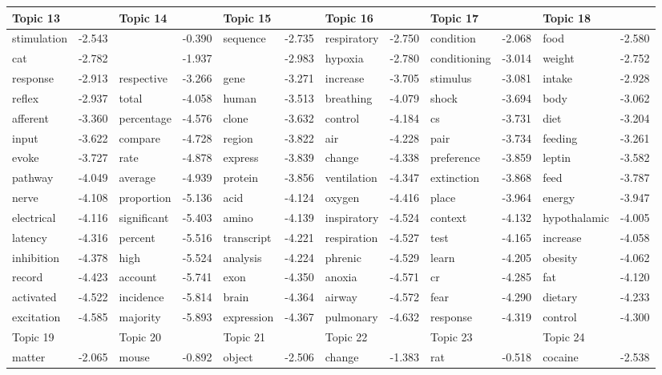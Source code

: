 \documentclass{article}
\begin{document}
\begin{table}
{\begin{tabular}{|l r|l r|l r|l r|l r|l r|}
\hline
\hline
Topic 13 & &Topic 14 & &Topic 15 & &Topic 16 & &Topic 17 & &Topic 18 &\\
\hline
stimulation & -2.543 &  & -0.390 & sequence & -2.735 & respiratory & -2.750 & condition & -2.068 & food & -2.580\\
cat & -2.782 &  & -1.937 &  & -2.983 & hypoxia & -2.780 & conditioning & -3.014 & weight & -2.752\\
response & -2.913 & respective & -3.266 & gene & -3.271 & increase & -3.705 & stimulus & -3.081 & intake & -2.928\\
reflex & -2.937 & total & -4.058 & human & -3.513 & breathing & -4.079 & shock & -3.694 & body & -3.062\\
afferent & -3.360 & percentage & -4.576 & clone & -3.632 & control & -4.184 & cs & -3.731 & diet & -3.204\\
input & -3.622 & compare & -4.728 & region & -3.822 & air & -4.228 & pair & -3.734 & feeding & -3.261\\
evoke & -3.727 & rate & -4.878 & express & -3.839 & change & -4.338 & preference & -3.859 & leptin & -3.582\\
pathway & -4.049 & average & -4.939 & protein & -3.856 & ventilation & -4.347 & extinction & -3.868 & feed & -3.787\\
nerve & -4.108 & proportion & -5.136 & acid & -4.124 & oxygen & -4.416 & place & -3.964 & energy & -3.947\\
electrical & -4.116 & significant & -5.403 & amino & -4.139 & inspiratory & -4.524 & context & -4.132 & hypothalamic & -4.005\\
latency & -4.316 & percent & -5.516 & transcript & -4.221 & respiration & -4.527 & test & -4.165 & increase & -4.058\\
inhibition & -4.378 & high & -5.524 & analysis & -4.224 & phrenic & -4.529 & learn & -4.205 & obesity & -4.062\\
record & -4.423 & account & -5.741 & exon & -4.350 & anoxia & -4.571 & cr & -4.285 & fat & -4.120\\
activated & -4.522 & incidence & -5.814 & brain & -4.364 & airway & -4.572 & fear & -4.290 & dietary & -4.233\\
excitation & -4.585 & majority & -5.893 & expression & -4.367 & pulmonary & -4.632 & response & -4.319 & control & -4.300\\
\hline
\hline
Topic 19 & &Topic 20 & &Topic 21 & &Topic 22 & &Topic 23 & &Topic 24 &\\
\hline
matter & -2.065 & mouse & -0.892 & object & -2.506 & change & -1.383 & rat & -0.518 & cocaine & -2.538\\

\end{tabular}}
\end{table}
\end{document}
